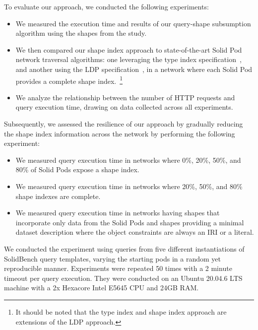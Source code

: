 To evaluate our approach, we conducted the following experiments: 
\begin{itemize}
   \item We measured the execution time and results of our query-shape subsumption algorithm using the shapes from the study.
   \item We then compared our shape index approach to state-of-the-art Solid Pod network traversal algorithms: one leveraging the type index specification~\cite{Taelman2023}, and another using the \ac{LDP} specification~\cite{Taelman2023}, in a network where each Solid Pod provides a complete shape index.~\footnote{It should be noted that the type index and shape index approach are extensions of the \ac{LDP} approach.}
   \item We analyze the relationship between the number of \ac{HTTP} requests and query execution time, drawing on data collected across all experiments.
\end{itemize}

Subsequently, we assessed the resilience of our approach by gradually reducing the shape index information across the network by performing the following experiment:

\begin{itemize}
   \item We measured query execution time in networks where 0\%, 20\%, 50\%, and 80\% of Solid Pods expose a shape index.
   \item We measured query execution time in networks where 20\%, 50\%, and 80\% shape indexes are complete.
   \item We measured query execution time in networks having shapes that incorporate only data from the Solid Pods and shapes providing a minimal dataset description where the object constraints are always an \ac{IRI} or a literal.
\end{itemize}

We conducted the experiment using queries from five different instantiations of SolidBench query templates, varying the starting pods in a random yet reproducible manner.
Experiments were repeated 50 times with a 2 minute timeout per query execution. 
They were conducted on an Ubuntu 20.04.6 LTS machine with a 2x Hexacore Intel E5645 CPU and 24GB RAM.


